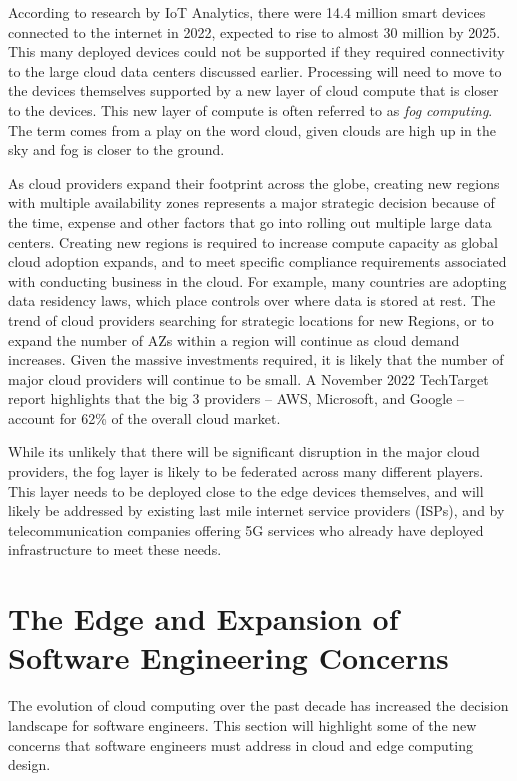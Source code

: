 \documentclass[conference]{IEEEtran}
\begin{document}
According to research by IoT Analytics, there were 14.4 million smart devices connected to the internet in 2022, expected to rise to almost 30 million by 2025\cite{IoTMarket}.  This many deployed devices could not be supported if they required connectivity to the large cloud data centers discussed earlier. Processing will need to move to the devices themselves supported by a new layer of cloud compute that is closer to the devices.  This new layer of compute is often referred to as \textit{fog computing}.  The term comes from a play on the word cloud, given clouds are high up in the sky and fog is closer to the ground.   

As cloud providers expand their footprint across the globe, creating new regions with multiple availability zones represents a major strategic decision because of the time, expense and other factors that go into rolling out multiple large data centers. Creating new regions is required to increase compute capacity as global cloud adoption expands, and to meet specific compliance requirements associated with conducting business in the cloud. For example, many countries are adopting data residency laws, which place controls over where data is stored at rest. The trend of cloud providers searching for strategic locations for new Regions, or to expand the number of AZs within a region will continue as cloud demand increases. Given the massive investments required, it is likely that the number of major cloud providers will continue to be small.  A November 2022 TechTarget report\cite{CloudMarketShare} highlights that the big 3 providers -- AWS, Microsoft, and Google -- account for 62\% of the overall cloud market. 

While its unlikely that there will be significant disruption in the major cloud providers, the fog layer is likely to be federated across many different players.  This layer needs to be deployed close to the edge devices themselves, and will likely be addressed by existing last mile internet service providers (ISPs), and by telecommunication companies offering 5G services who already have deployed infrastructure to meet these needs.  


\section{The Edge and Expansion of Software Engineering Concerns}
\label{sec:Polyglot}
The evolution of cloud computing over the past decade has increased the decision landscape for software engineers. This section will highlight some of the new concerns that software engineers must address in cloud and edge computing design.
\end{document}
